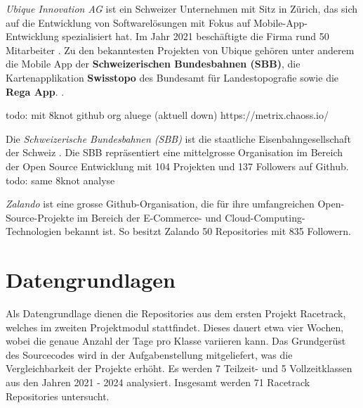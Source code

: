\textit{Ubique Innovation AG} ist ein Schweizer Unternehmen mit Sitz in Zürich, das sich auf die Entwicklung von Softwarelösungen mit Fokus auf Mobile-App-Entwicklung spezialisiert hat. Im Jahr 2021 beschäftigte die Firma rund 50 Mitarbeiter \cite{noauthor_mathias_2021}. Zu den bekanntesten Projekten von Ubique gehören unter anderem die Mobile App der \textbf{Schweizerischen Bundesbahnen (SBB)}, die Kartenapplikation \textbf{Swisstopo} des Bundesamt für Landestopografie sowie die \textbf{Rega App}. \parencite{noauthor_apps_nodate}.

todo: mit 8knot github org aluege (aktuell down) 
https://metrix.chaoss.io/

Die \textit{Schweizerische Bundesbahnen (SBB)} ist die staatliche Eisenbahngesellschaft der Schweiz \parencite{uvek_verkehr_energie_und_kommunikation_eidgenossisches_departement_fur_umwelt_schweizerische_nodate}. Die SBB repräsentiert eine mittelgrosse Organisation im Bereich der Open Source Entwicklung mit 104 Projekten und 137 Followers auf Github. \parencite{noauthor_swiss_nodate} 
todo: same 8knot analyse

\textit{Zalando} ist eine grosse Github-Organisation, die für ihre umfangreichen Open-Source-Projekte im Bereich der E-Commerce- und Cloud-Computing-Technologien bekannt ist. So besitzt Zalando 50 Repositories mit 835 Followern. \parencite{noauthor_zalando_nodate}


\section{Datengrundlagen}
\label{sec:Datengrundlagen}
Als Datengrundlage dienen die Repositories aus dem ersten Projekt Racetrack, welches im zweiten Projektmodul stattfindet. Dieses dauert etwa vier Wochen, wobei die genaue Anzahl der Tage pro Klasse variieren kann. Das Grundgerüst des Sourcecodes wird in der Aufgabenstellung mitgeliefert, was die Vergleichbarkeit der Projekte erhöht. Es werden 7 Teilzeit- und 5 Vollzeitklassen aus den Jahren 2021 - 2024 analysiert. Insgesamt werden 71 Racetrack Repositories untersucht. 
